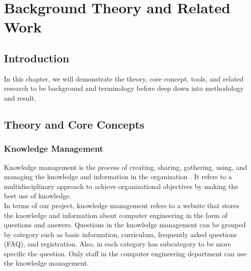 \documentclass[12pt,oneside,openright,a4paper]{cpe-english-project}
\begin{document}
\chapter{Background Theory and Related Work}

\section{Introduction}
In this chapter, we will demonstrate the theory, core concept, tools, and related research to be background 
and terminology before deep down into methodology and result.

\section{Theory and Core Concepts}
\subsection{Knowledge Management}
Knowledge management is the process of creating, sharing, gathering, using, and managing the knowledge 
and information in the organization \cite{what_is_km}. It refers to a multidisciplinary approach to
achieve organizational objectives by making the best use of knowledge.\\
In terms of our project, knowledge management refers to a website that stores the knowledge and information about 
computer engineering in the form of questions and answers. Questions in the knowledge management
can be grouped by category such as basic information, curriculum, frequently asked questions (FAQ), and registration.
Also, in each category has subcategory to be more specific the question.
Only staff in the computer engineering department can use the knowledge management.
 
\end{document}
